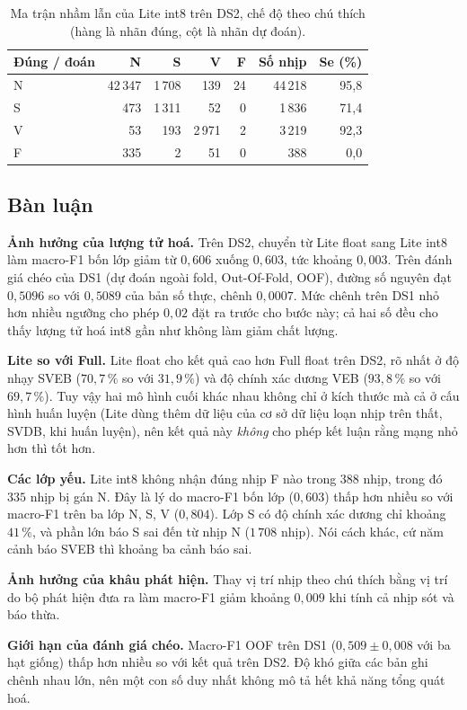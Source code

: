 \begin{table}[htbp]\centering
\caption{Ma trận nhầm lẫn của Lite int8 trên DS2, chế độ theo chú thích (hàng là nhãn đúng, cột là nhãn dự đoán).}\label{tab:nhamlan}
\small
\begin{tabular}{@{}lrrrrrr@{}}
\toprule
Đúng / đoán & N & S & V & F & Số nhịp & Se (\%) \\ \midrule
N & 42\,347 & 1\,708 & 139 & 24 & 44\,218 & 95{,}8 \\
S & 473 & 1\,311 & 52 & 0 & 1\,836 & 71{,}4 \\
V & 53 & 193 & 2\,971 & 2 & 3\,219 & 92{,}3 \\
F & 335 & 2 & 51 & 0 & 388 & 0{,}0 \\ \bottomrule
\end{tabular}
\end{table}

\subsection{Bàn luận}
\textbf{Ảnh hưởng của lượng tử hoá.}
Trên DS2, chuyển từ Lite float sang Lite int8 làm macro-F1 bốn lớp giảm từ $0{,}606$ xuống $0{,}603$, tức khoảng $0{,}003$.
Trên đánh giá chéo của DS1 (dự đoán ngoài fold, Out-Of-Fold, OOF), đường số nguyên đạt $0{,}5096$ so với $0{,}5089$ của bản số thực, chênh $0{,}0007$.
Mức chênh trên DS1 nhỏ hơn nhiều ngưỡng cho phép $0{,}02$ đặt ra trước cho bước này; cả hai số đều cho thấy lượng tử hoá int8 gần như không làm giảm chất lượng.

\textbf{Lite so với Full.}
Lite float cho kết quả cao hơn Full float trên DS2, rõ nhất ở độ nhạy SVEB ($70{,}7\,\%$ so với $31{,}9\,\%$) và độ chính xác dương VEB ($93{,}8\,\%$ so với $69{,}7\,\%$).
Tuy vậy hai mô hình cuối khác nhau không chỉ ở kích thước mà cả ở cấu hình huấn luyện (Lite dùng thêm dữ liệu của cơ sở dữ liệu loạn nhịp trên thất, SVDB, khi huấn luyện), nên kết quả này \emph{không} cho phép kết luận rằng mạng nhỏ hơn thì tốt hơn.

\textbf{Các lớp yếu.}
Lite int8 không nhận đúng nhịp F nào trong $388$ nhịp, trong đó $335$ nhịp bị gán N.
Đây là lý do macro-F1 bốn lớp ($0{,}603$) thấp hơn nhiều so với macro-F1 trên ba lớp N, S, V ($0{,}804$).
Lớp S có độ chính xác dương chỉ khoảng $41\,\%$, và phần lớn báo S sai đến từ nhịp N ($1\,708$ nhịp).
Nói cách khác, cứ năm cảnh báo SVEB thì khoảng ba cảnh báo sai.

\textbf{Ảnh hưởng của khâu phát hiện.}
Thay vị trí nhịp theo chú thích bằng vị trí do bộ phát hiện đưa ra làm macro-F1 giảm khoảng $0{,}009$ khi tính cả nhịp sót và báo thừa.

\textbf{Giới hạn của đánh giá chéo.}
Macro-F1 OOF trên DS1 ($0{,}509\pm0{,}008$ với ba hạt giống) thấp hơn nhiều so với kết quả trên DS2.
Độ khó giữa các bản ghi chênh nhau lớn, nên một con số duy nhất không mô tả hết khả năng tổng quát hoá.
